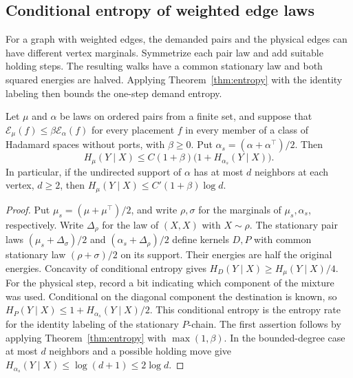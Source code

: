 \subsection{Conditional entropy of weighted edge laws}\label{sec:cursor-entropy}

For a graph with weighted edges, the demanded pairs and the
physical edges can have different vertex marginals. Symmetrize each
pair law and add suitable holding steps. The resulting walks have a
common stationary law and both squared energies are halved. Applying Theorem~\ref{thm:entropy} with the
identity labeling then bounds the one-step demand entropy.

\begin{corollary}\label{cor:graph-entropy}
Let $\mu$ and $\alpha$ be laws on ordered pairs from a finite set, and
suppose that $\mathcal E_\mu(f)\le\beta\mathcal E_\alpha(f)$
for every placement \(f\) in every member of a class of Hadamard
spaces without ports, with \(\beta\ge0\). Put
$\alpha_s=(\alpha+\alpha^\top)/2$. Then
\[
 H_\mu(Y\mid X)\le C(1+\beta)\big(1+H_{\alpha_s}(Y\mid X)\big).
\]
In particular, if the undirected support of $\alpha$ has at most
$d$ neighbors at each vertex, $d\ge2$, then
$H_\mu(Y\mid X)\le C'(1+\beta)\log d$.
\end{corollary}
\begin{proof}
Put $\mu_s=(\mu+\mu^\top)/2$, and write $\rho,\sigma$ for the
marginals of $\mu_s,\alpha_s$, respectively. Write $\Delta_\rho$ for the
law of $(X,X)$ with $X\sim\rho$. The stationary pair laws
$(\mu_s+\Delta_\sigma)/2$ and $(\alpha_s+\Delta_\rho)/2$ define
kernels $D,P$ with common stationary law $(\rho+\sigma)/2$ on its
support. Their energies are half the original energies. Concavity of
conditional entropy gives $H_D(Y\mid X)\ge H_\mu(Y\mid X)/4$.
For the physical step, record a bit indicating which component of the
mixture was used. Conditional on the diagonal component the destination
is known, so $H_P(Y\mid X)\le 1+H_{\alpha_s}(Y\mid X)/2$.
This conditional entropy is the entropy rate for the identity labeling
of the stationary $P$-chain. The first assertion follows by applying
Theorem~\ref{thm:entropy} with $\max(1,\beta)$. In the bounded-degree
case at most $d$ neighbors and a possible holding move give
$H_{\alpha_s}(Y\mid X)\le\log(d+1)\le2\log d$.
\end{proof}
